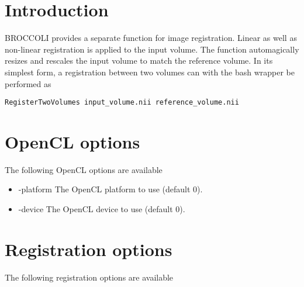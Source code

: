 \section{Introduction}

BROCCOLI provides a separate function for image registration. Linear as well as non-linear registration is applied to the input volume. The function automagically resizes and rescales the input volume to match the reference volume. In its simplest form, a registration between two volumes can with the bash wrapper be performed as

\begin{verbatim}
RegisterTwoVolumes input_volume.nii reference_volume.nii
\end{verbatim}

\section{OpenCL options}

The following OpenCL options are available

\begin{itemize}

\item -platform
\newline \newline The OpenCL platform to use (default 0).

\item -device
\newline \newline The OpenCL device to use (default 0).

\end{itemize}

\section{Registration options}

The following registration options are available

